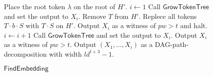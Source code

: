 \documentclass[runningheads]{llncs}
\theoremstyle{plain}
\theoremstyle{definition}
\begin{document}
\begin{figure}[!t]
\begin{algorithm}[H]
    \caption{$\mathsf{FindEmbedding}$}
	\label{findEmbedding}
	\begin{algorithmic}[1]
    \STATE Place the root token $\lambda$ on the root of $H'$.
    \STATE $i \leftarrow 1$
    \STATE Call $\mathsf{GrowTokenTree}$ and set the output to $X_i$.
    \STATE Remove $T$ from $H'$.
    \STATE Replece all tokens $T \cdot b \cdot S$ with $T \cdot S$ on $H'$.
    \ENDIF
    \ELSE
    \STATE Output $X_i$ as a witness of $pw > t$ and halt.
    \ENDIF
    \STATE $i \leftarrow i+1$
    \STATE Call $\mathsf{GrowTokenTree}$ and set the output to $X_i$.
    \ENDWHILE
    \STATE Output $X_i$ as a witness of $pw > t$.
    \ENDIF
    \STATE Output $(X_1,\ldots,X_i)$ as a DAG-path-decomposition with width $ld^{t+3}-1$.
    \ENDIF
	\end{algorithmic}
\end{algorithm}
\end{figure}


\begin{comment}
\ifthenelse{\boolean{Draft}}{
\begin{figure}[t]
    \centering
    \texttt{[image: pic11.eps]}
    \caption{Illustration of the operation of $\mathsf{GrowTokenTree}$. The orange tokens in $M_{t, d, l}$ indicate \textit{tokened} tokens. Starting from each left state and ending with each right state. $\mathsf{GrowTokenTree}$ places tokens of $M_{t, d, l}$ onto vertices of $H'$ while preserving the tree structure}
    \label{fig:11}
\end{figure}
}
\end{comment}



\end{document}
